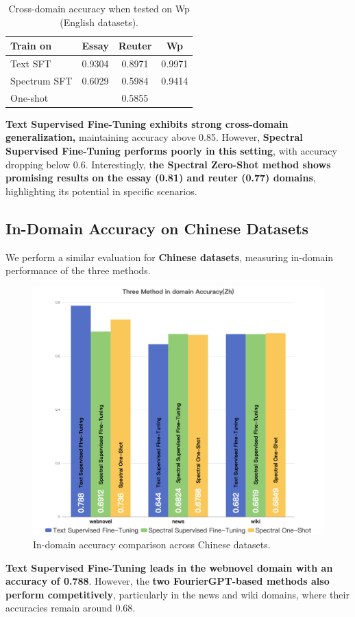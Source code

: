 \documentclass[lettersize,journal]{IEEEtran}
\begin{document}
\begin{table}[H]
\centering
\begin{tabular}{|l|c|c|c|}
\hline
Train on & Essay & Reuter & Wp \\
\hline
Text SFT     & 0.9304 & 0.8971 & 0.9971 \\
\hline
Spectrum SFT & 0.6029 & 0.5984 & 0.9414 \\
\hline
One-shot     & \multicolumn{3}{c|}{0.5855} \\
\hline
\end{tabular}
\caption{Cross-domain accuracy when tested on Wp (English datasets).}
\end{table}
\textbf{Text Supervised Fine-Tuning exhibits strong cross-domain generalization,} maintaining accuracy above 0.85. However, \textbf{Spectral Supervised Fine-Tuning performs poorly in this setting}, with accuracy dropping below 0.6. Interestingly, t\textbf{he Spectral Zero-Shot method shows promising results on the essay (0.81) and reuter (0.77) domains}, highlighting its potential in specific scenarios.

\subsection{In-Domain Accuracy on Chinese Datasets}

We perform a similar evaluation for \textbf{Chinese datasets}, measuring in-domain performance of the three methods.

\begin{figure}[H]
    \centering
    \includegraphics[width=0.65\linewidth]{images/Three Method in domain Accuracy(Zh).png}
    \caption{In-domain accuracy comparison across Chinese datasets.}
\end{figure}


\textbf{Text Supervised Fine-Tuning leads in the webnovel domain with an accuracy of 0.788}. However, the \textbf{two FourierGPT-based methods also perform competitively}, particularly in the news and wiki domains, where their accuracies remain around 0.68.
\end{document}
